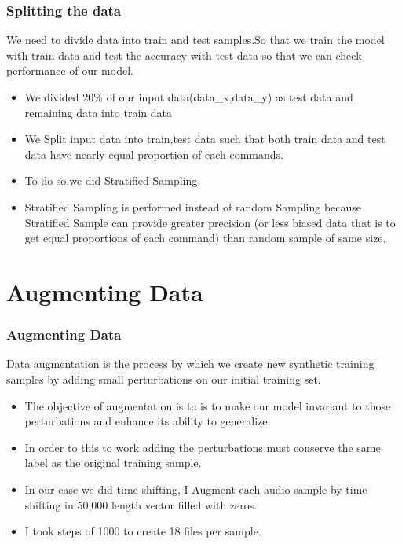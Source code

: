 \documentclass{beamer}
\begin{document}
\begin{frame}
\frametitle{Splitting the data}

We need to divide data into train and test samples.So that we train the model with
train data and test the accuracy with test data so that we can check performance of our model.\\

\begin{itemize}
    \item<1-> We divided 20\% of our input data(data\_x,data\_y) as test data and remaining data into train data 
    \item<2-> We Split input data into train,test data such that both train data and test data have nearly equal proportion of each commands. 
    \item<3-> To do so,we did Stratified Sampling.
    \item<4-> Stratified Sampling is performed instead of random Sampling because Stratified Sample can provide greater precision (or less biased data that is to get equal proportions of each command) than random sample of same size.
\end{itemize}


\end{frame}

\section{Augmenting Data}
\begin{frame}
\frametitle{Augmenting Data}

Data augmentation is the process by which we create new synthetic training samples by adding small perturbations on our initial training set.\\

\begin{itemize}
    \item<1-> The objective of augmentation is to is to make our model invariant to those perturbations and enhance its ability to generalize.
    \item<2-> In order to this to work adding the perturbations must conserve the same label as the original training sample.
    \item<3-> In our case we did time-shifting, I Augment each audio sample by time shifting in 50,000 length vector filled with zeros.
    \item<4-> I took steps of 1000 to create 18 files per sample.
\end{itemize}
\end{frame}
\end{document}
